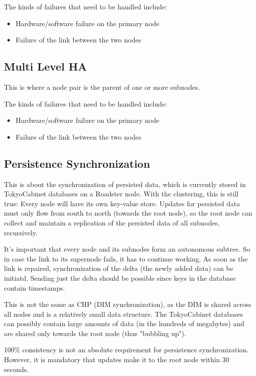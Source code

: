 The kinds of failures that need to be handled include:
\begin{itemize}
	\item Hardware/software failure on the primary node
	\item Failure of the link between the two nodes
\end{itemize}



\subsection{Multi Level HA}
This is where a node pair is the parent of one or more subnodes.

The kinds of failures that need to be handled include:
\begin{itemize}
	\item Hardware/software failure on the primary node
	\item Failure of the link between the two nodes
\end{itemize}

\subsection{Persistence Synchronization}
This is about the synchronization of persisted data, which is currently stored
in TokyoCabinet databases on a Roadster node. With the clustering, this is
still true: Every node will have its own key-value store. Updates for persisted
data must only flow from south to north (towards the root node), so the root
node can collect and maintain a replication of the persisted data of all
subnodes, recursively.

It's important that every node and its subnodes form an autonomous subtree. So
in case the link to its supernode fails, it has to continue working. As soon as
the link is repaired, synchronization of the delta (the newly added data) can
be initiatd. Sending just the delta should be possible since keys in the
database contain timestamps.

This is not the same as \gls{CHP} (\gls{DIM} synchronization), as the DIM is shared across
all nodes and is a relatively small data structure. The TokyoCabinet databases
can possibly contain large amounts of data (in the hundreds of megabytes) and
are shared only towards the root node (thus "bubbling up").

100\% consistency is not an absolute requirement for persistence synchronization.
However, it is mandatory that updates make it to the root node within 30 seconds.

